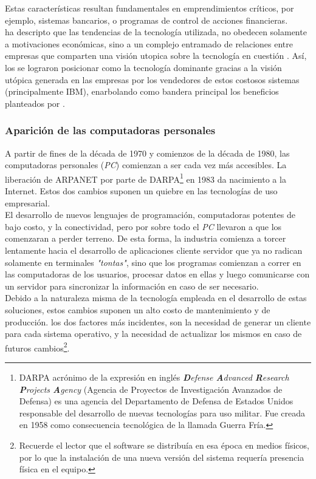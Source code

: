 Estas características resultan fundamentales en emprendimientos críticos, por ejemplo,
sistemas bancarios, o programas de control de acciones financieras.\\
  ha descripto que las tendencias de la
 tecnología utilizada, no obedecen solamente a motivaciones económicas, sino a un
 complejo entramado de relaciones entre empresas que comparten una visión utopica sobre
 la tecnología en cuestión . Así, los \mainframes se
 lograron posicionar como la tecnología dominante gracias a la visión utópica generada
 en las empresas por los vendedores de estos costosos sistemas (principalmente IBM),
 enarbolando como bandera principal los beneficios planteados por
 \citeauthor{Stephens:2008:BOOK}.
 
\subsubsection{Aparición de las computadoras personales}

A partir de fines de la década de 1970 y comienzos de la década de 1980, las computadoras
personales (\emph{PC}) comienzan a ser cada vez más accesibles. La liberación de ARPANET
por parte de DARPA\footnote{
	DARPA acrónimo de la expresión en inglés \emph{\textbf{D}efense \textbf{A}dvanced
	\textbf{R}esearch \textbf{P}rojects \textbf{A}gency} (Agencia de Proyectos de
	Investigación Avanzados de Defensa) es una agencia del Departamento de Defensa de
	Estados Unidos responsable del desarrollo de nuevas tecnologías para uso militar.
	Fue creada en 1958 como consecuencia tecnológica de la llamada Guerra Fría.
} en 1983 da nacimiento a la Internet. Estos dos cambios suponen un quiebre
en las tecnologías de uso empresarial.\\
El desarrollo de nuevos lenguajes de programación, computadoras potentes de bajo costo, y
la conectividad, pero por sobre todo el \emph{PC} llevaron a que los \mainframes comenzaran
a perder terreno. De esta forma, la industria comienza a torcer lentamente hacia el desarrollo
de aplicaciones cliente servidor que ya no radican solamente en terminales \emph{"tontas"},
sino que los programas comienzan a correr en las computadoras de los usuarios, procesar datos
en ellas y luego comunicarse con un servidor para sincronizar la información en caso de ser
necesario.\\
Debido a la naturaleza misma de la tecnología empleada en el desarrollo de estas soluciones,
estos cambios suponen un alto costo de mantenimiento y de producción. los dos factores más
incidentes, son la necesidad de generar un cliente para cada sistema operativo, y la necesidad
de actualizar los mismos en caso de futuros cambios\footnote{
	Recuerde el lector que el software se distribuía en esa época en medios físicos, por
	lo que la instalación de una nueva versión del sistema requería presencia física en el
	equipo.
}.

